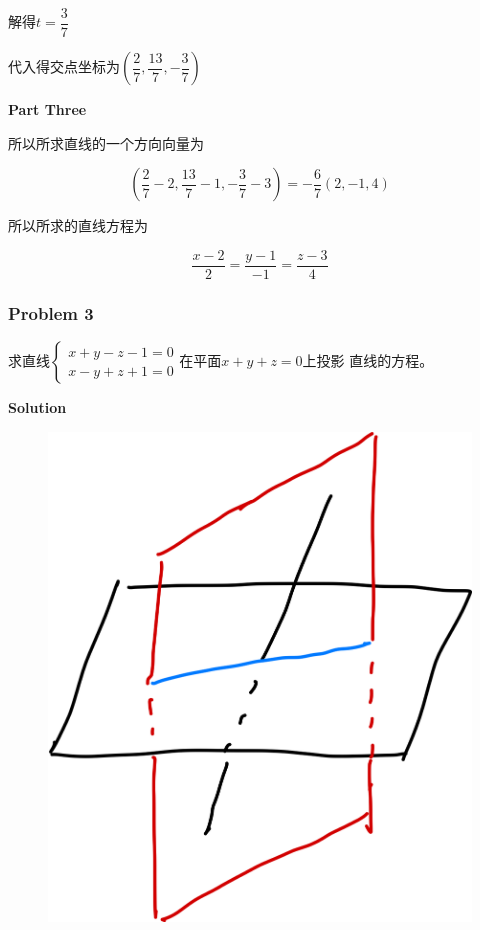 \documentclass[
	11pt, %
	a4paper, %
]{WhuSakuraBook}
\begin{document}
    解得\(t=\dfrac{3}{7}\)

    代入得交点坐标为$\left(\dfrac{2}{7}, \dfrac{13}{7},-\dfrac{3}{7}\right)$

    \textbf{Part Three}

    所以所求直线的一个方向向量为

    $$
        \left(\frac{2}{7}-2, \frac{13}{7}-1,-\frac{3}{7}-3\right)=-\frac{6}{7}(2,-1,4)
    $$

    所以所求的直线方程为

    $$
        \frac{x-2}{2}=\frac{y-1}{-1}=\frac{z-3}{4}
    $$

\subsubsection*{Problem 3}

    求直线$\left\{\begin{array}{l}x+y-z-1=0 \\ x-y+z+1=0\end{array}\right.$在平面\(x+y+z=0\)上投影
    直线的方程。
    \vspace{1em}

    \textbf{Solution}
    \vspace{1em}

    \begin{figure}
        \centering
        \includegraphics[scale=0.08]{"Chapter 08 images/pic2.png"}
        \label{pic2}
    \end{figure}
\end{document}
